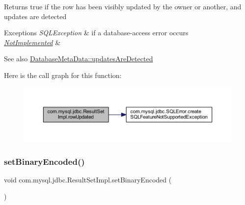 \begin{DoxyReturn}{Returns}
true if the row has been visibly updated by the owner or another, and updates are detected
\end{DoxyReturn}

\begin{DoxyExceptions}{Exceptions}
{\em S\+Q\+L\+Exception} & if a database-\/access error occurs \\
\hline
{\em \mbox{\hyperlink{classcom_1_1mysql_1_1jdbc_1_1_not_implemented}{Not\+Implemented}}} & \\
\hline
\end{DoxyExceptions}
\begin{DoxySeeAlso}{See also}
\mbox{\hyperlink{classcom_1_1mysql_1_1jdbc_1_1_database_meta_data_a59dee4ec20a09deed13ec6efcbe5a0dd}{Database\+Meta\+Data\+::updates\+Are\+Detected}} 
\end{DoxySeeAlso}
Here is the call graph for this function\+:
\nopagebreak
\begin{figure}[H]
\begin{center}
\leavevmode
\includegraphics[width=350pt]{classcom_1_1mysql_1_1jdbc_1_1_result_set_impl_a6a1bb16fac14ca4cb15ad07292a371ae_cgraph}
\end{center}
\end{figure}
\mbox{\label{classcom_1_1mysql_1_1jdbc_1_1_result_set_impl_a0de56a711844a94ebbfa703db2d8987e}} 
\subsubsection{\texorpdfstring{set\+Binary\+Encoded()}{setBinaryEncoded()}}
{\footnotesize\ttfamily void com.\+mysql.\+jdbc.\+Result\+Set\+Impl.\+set\+Binary\+Encoded (\begin{DoxyParamCaption}{ }\end{DoxyParamCaption})\hspace{0.3cm}{\ttfamily [protected]}}

